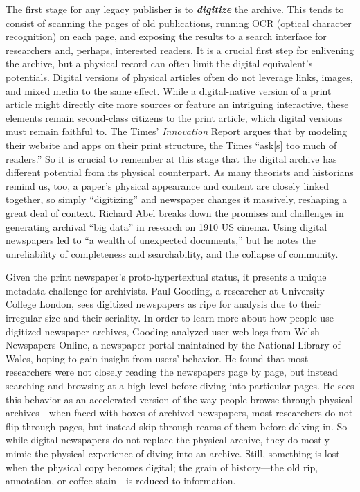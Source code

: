 The first stage for any legacy publisher is to \textbf{\emph{digitize}} the archive. This tends to consist of scanning the pages of old publications, running OCR (optical character recognition) on each page, and exposing the results to a search interface for researchers and, perhaps, interested readers. It is a crucial first step for enlivening the archive, but a physical record can often limit the digital equivalent's potentials. Digital versions of physical articles often do not leverage links, images, and mixed media to the same effect. While a digital-native version of a print article might directly cite more sources or feature an intriguing interactive, these elements remain second-class citizens to the print article, which digital versions must remain faithful to. The Times' \emph{Innovation} Report argues that by modeling their website and apps on their print structure, the Times ``ask[s] too much of readers.''\autocite[26]{_innovation_2014} So it is crucial to remember at this stage that the digital archive has different potential from its physical counterpart. As many theorists and historians remind us, too, a paper's physical appearance and content are closely linked together, so simply ``digitizing'' and newspaper changes it massively, reshaping a great deal of context.\autocite[388-389]{mussell_elemental_2014,manoff_archive_2010} Richard Abel breaks down the promises and challenges in generating archival ``big data'' in research on 1910 US cinema. Using digital newspapers led to ``a wealth of unexpected documents,'' but he notes the unreliability of completeness and searchability, and the collapse of community.\autocite{abel_pleasures_2013}


Given the print newspaper's proto-hypertextual status, it presents a unique metadata challenge for archivists. Paul Gooding, a researcher at University College London, sees digitized newspapers as ripe for analysis due to their irregular size and their seriality.\autocite{gooding_exploring_2014} In order to learn more about how people use digitized newspaper archives, Gooding analyzed user web logs from Welsh Newspapers Online, a newspaper portal maintained by the National Library of Wales, hoping to gain insight from users' behavior. He found that most researchers were not closely reading the newspapers page by page, but instead searching and browsing at a high level before diving into particular pages. He sees this behavior as an accelerated version of the way people browse through physical archives---when faced with boxes of archived newspapers, most researchers do not flip through pages, but instead skip through reams of them before delving in. So while digital newspapers do not replace the physical archive, they do mostly mimic the physical experience of diving into an archive. Still, something is lost when the physical copy becomes digital; the grain of history---the old rip, annotation, or coffee stain---is reduced to information.


